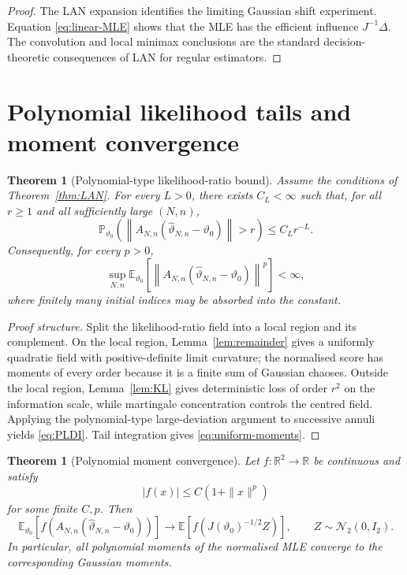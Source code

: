 \documentclass[11pt]{article}
\newtheorem{theorem}[assumption]{Theorem}
\theoremstyle{remark}
\newcommand{\E}{\mathbb E}
\newcommand{\Pp}{\mathbb P}
\newcommand{\R}{\mathbb R}
\newcommand{\1}{\mathbf 1}
\newcommand{\An}{A_{N,n}}
\newcommand{\vzero}{\vartheta_0}
\begin{document}
\begin{proof}
The LAN expansion identifies the limiting Gaussian shift experiment.  Equation \eqref{eq:linear-MLE} shows that the MLE has the efficient influence $J^{-1}\Delta$.  The convolution and local minimax conclusions are the standard decision-theoretic consequences of LAN for regular estimators.
\end{proof}

\section{Polynomial likelihood tails and moment convergence}

\begin{theorem}[Polynomial-type likelihood-ratio bound]\label{thm:PLDI}
Assume the conditions of Theorem~\ref{thm:LAN}.  For every $L>0$, there exists $C_L<\infty$ such that, for all $r\ge1$ and all sufficiently large $(N,n)$,
\begin{equation}\label{eq:PLDI}
 \Pp_{\vzero}\left(
 \left\|\An(\widehat\vartheta_{N,n}-\vzero)\right\|>r
 \right)
 \le C_Lr^{-L}.
\end{equation}
Consequently, for every $p>0$,
\begin{equation}\label{eq:uniform-moments}
 \sup_{N,n}
 \E_{\vzero}\left[
 \left\|\An(\widehat\vartheta_{N,n}-\vzero)\right\|^p
 \right]<\infty,
\end{equation}
where finitely many initial indices may be absorbed into the constant.
\end{theorem}

\begin{proof}[Proof structure]
Split the likelihood-ratio field into a local region and its complement.  On the local region, Lemma~\ref{lem:remainder} gives a uniformly quadratic field with positive-definite limit curvature; the normalised score has moments of every order because it is a finite sum of Gaussian chaoses.  Outside the local region, Lemma~\ref{lem:KL} gives deterministic loss of order $r^2$ on the information scale, while martingale concentration controls the centred field.  Applying the polynomial-type large-deviation argument to successive annuli yields \eqref{eq:PLDI}.  Tail integration gives \eqref{eq:uniform-moments}.
\end{proof}

\begin{theorem}[Polynomial moment convergence]\label{thm:moment-convergence}
Let $f:\R^2\to\R$ be continuous and satisfy
\[
 |f(x)|\le C(1+\|x\|^p)
\]
for some finite $C,p$.  Then
\begin{equation}\label{eq:moment-convergence}
 \E_{\vzero}\left[
 f\!\left(\An(\widehat\vartheta_{N,n}-\vzero)\right)
 \right]
 \longrightarrow
 \E\left[f\!\left(J(\vzero)^{-1/2}Z\right)\right],
 \qquad Z\sim\mathcal N_2(0,I_2).
\end{equation}
In particular, all polynomial moments of the normalised MLE converge to the corresponding Gaussian moments.
\end{theorem}
\end{document}
